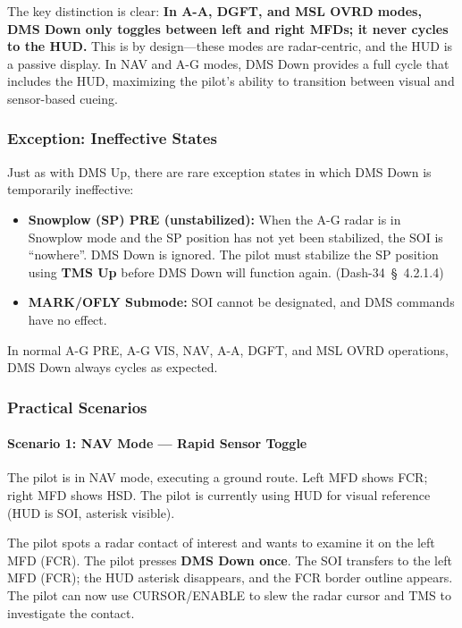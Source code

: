 \documentclass[11pt,a4paper]{article}
\providecommand{\dashref}[1]{Dash-34~\S~#1}
\begin{document}
The key distinction is clear: \textbf{In A-A, DGFT, and MSL OVRD modes, DMS Down only toggles between left and right MFDs; it never cycles to the HUD.} This is by design---these modes are radar-centric, and the HUD is a passive display. In NAV and A-G modes, DMS Down provides a full cycle that includes the HUD, maximizing the pilot's ability to transition between visual and sensor-based cueing.

\subsubsection{Exception: Ineffective States}

Just as with DMS Up, there are rare exception states in which DMS Down is temporarily ineffective:

\begin{itemize}

\item \textbf{Snowplow (SP) PRE (unstabilized):} When the A-G radar is in Snowplow mode and the SP position has not yet been stabilized, the SOI is ``nowhere''. DMS Down is ignored. The pilot must stabilize the SP position using \textbf{TMS Up} before DMS Down will function again. (\dashref{4.2.1.4})

\item \textbf{MARK/OFLY Submode:} SOI cannot be designated, and DMS commands have no effect.

\end{itemize}

In normal A-G PRE, A-G VIS, NAV, A-A, DGFT, and MSL OVRD operations, DMS Down always cycles as expected.

\subsubsection{Practical Scenarios}

\paragraph*{Scenario 1: NAV Mode — Rapid Sensor Toggle}

The pilot is in NAV mode, executing a ground route. Left MFD shows FCR; right MFD shows HSD. The pilot is currently using HUD for visual reference (HUD is SOI, asterisk visible).

The pilot spots a radar contact of interest and wants to examine it on the left MFD (FCR). The pilot presses \textbf{DMS Down once}. The SOI transfers to the left MFD (FCR); the HUD asterisk disappears, and the FCR border outline appears. The pilot can now use CURSOR/ENABLE to slew the radar cursor and TMS to investigate the contact.
\end{document}
